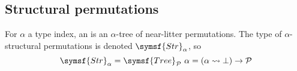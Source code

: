 \subsection{Structural permutations}

\begin{definition}
    For \( \alpha \) a type index, an  is an \( \alpha \)-tree of near-litter permutations.
    The type of \( \alpha \)-structural permutations is denoted \( \symsf{Str}_\alpha \), so
    \[ \symsf{Str}_\alpha = \symsf{Tree}_{\mathcal P}\ \alpha = (\alpha \rightsquigarrow \bot) \to \mathcal P \]
\end{definition}
